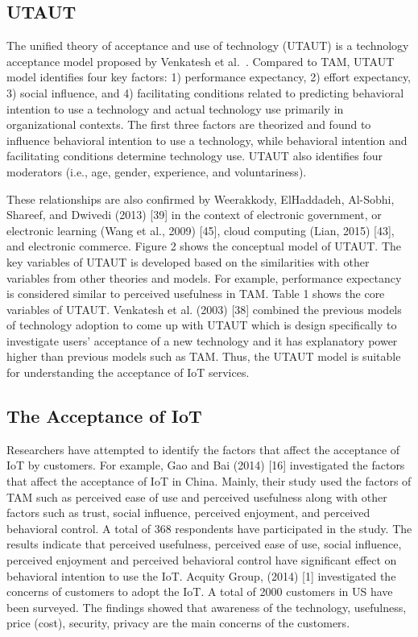 \subsection{UTAUT}
The unified theory of acceptance and use of technology (UTAUT) is a technology acceptance model proposed by Venkatesh et al.~\cite{venkatesh2003user}. Compared to TAM, UTAUT model identifies four key factors: 1) performance expectancy, 2) effort expectancy, 3) social influence, and 4) facilitating conditions related to predicting behavioral intention to use a technology and actual technology use primarily in organizational contexts. The first three factors are theorized and found to influence behavioral intention to use a technology, while behavioral intention and facilitating conditions determine technology use. UTAUT also identifies four moderators (i.e., age, gender, experience, and voluntariness).

These relationships are also confirmed by Weerakkody, ElHaddadeh, Al-Sobhi, Shareef, and Dwivedi (2013) [39] in the context of electronic government, or electronic learning
(Wang et al., 2009) [45], cloud computing (Lian, 2015) [43], and electronic commerce. Figure 2 shows the conceptual model of UTAUT. The key variables of UTAUT is developed based on the
similarities with other variables from other theories and
models. For example, performance expectancy is considered
similar to perceived usefulness in TAM. Table 1 shows the
core variables of UTAUT. Venkatesh et al. (2003) [38] combined the previous models of
technology adoption to come up with UTAUT which is
design specifically to investigate users’ acceptance of a new
technology and it has explanatory power higher than
previous models such as TAM. Thus, the UTAUT model is
suitable for understanding the acceptance of IoT services. 

\subsection{The Acceptance of IoT}
Researchers have attempted to identify the factors that affect
the acceptance of IoT by customers. For example, Gao and
Bai (2014) [16] investigated the factors that affect the
acceptance of IoT in China. Mainly, their study used the
factors of TAM such as perceived ease of use and perceived
usefulness along with other factors such as trust, social
influence, perceived enjoyment, and perceived behavioral
control. A total of 368 respondents have participated in the
study. The results indicate that perceived usefulness,
perceived ease of use, social influence, perceived enjoyment
and perceived behavioral control have significant effect on
behavioral intention to use the IoT. Acquity Group, (2014)
[1] investigated the concerns of customers to adopt the IoT.
A total of 2000 customers in US have been surveyed. The
findings showed that awareness of the technology,
usefulness, price (cost), security, privacy are the main
concerns of the customers. 

